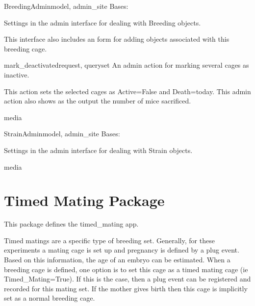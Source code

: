 \documentclass[letterpaper,10pt,english]{sphinxmanual}
\begin{document}
\hypertarget{animal.admin.BreedingAdmin}{}\begin{classdesc}{BreedingAdmin}{model, admin\_site}
Bases: 

Settings in the admin interface for dealing with Breeding objects.

This interface also includes an form for adding objects associated with this breeding cage.

\hypertarget{animal.admin.BreedingAdmin.mark\_deactivated}{}\begin{methoddesc}{mark\_deactivated}{request, queryset}
An admin action for marking several cages as inactive.

This action sets the selected cages as Active=False and Death=today.
This admin action also shows as the output the number of mice sacrificed.
\end{methoddesc}

\hypertarget{animal.admin.BreedingAdmin.media}{}\begin{memberdesc}{media}\end{memberdesc}
\end{classdesc}

\hypertarget{animal.admin.StrainAdmin}{}\begin{classdesc}{StrainAdmin}{model, admin\_site}
Bases: 

Settings in the admin interface for dealing with Strain objects.

\hypertarget{animal.admin.StrainAdmin.media}{}\begin{memberdesc}{media}\end{memberdesc}
\end{classdesc}


\section{Timed Mating Package}
\hypertarget{module-timed\_mating}{}
\modulesynopsis{}
This package defines the timed\_mating app.

Timed matings are a specific type of breeding set.  
Generally, for these experiments a mating cage is set up and pregnancy is defined by a plug event.  
Based on this information, the age of an embryo can be estimated.  
When a breeding cage is defined, one option is to set this cage as a timed mating cage (ie Timed\_Mating=True).  
If this is the case, then a plug event can be registered and recorded for this mating set.  
If the mother gives birth then this cage is implicitly set as a normal breeding cage.
\end{document}
